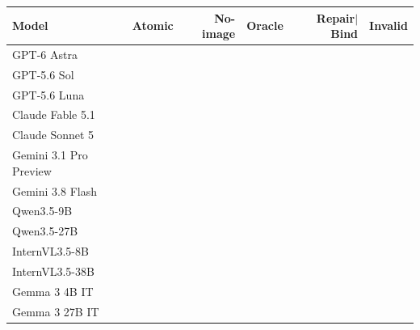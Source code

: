 \begin{tabular}{@{}lrrrrr@{}}
\toprule
Model & Atomic & No-image & Oracle & Repair$|$Bind & Invalid\\
\midrule
GPT-6 Astra &  &  &  &  & \\
GPT-5.6 Sol &  &  &  &  & \\
GPT-5.6 Luna &  &  &  &  & \\
Claude Fable 5.1 &  &  &  &  & \\
Claude Sonnet 5 &  &  &  &  & \\
Gemini 3.1 Pro Preview &  &  &  &  & \\
Gemini 3.8 Flash &  &  &  &  & \\
Qwen3.5-9B &  &  &  &  & \\
Qwen3.5-27B &  &  &  &  & \\
InternVL3.5-8B &  &  &  &  & \\
InternVL3.5-38B &  &  &  &  & \\
Gemma 3 4B IT &  &  &  &  & \\
Gemma 3 27B IT &  &  &  &  & \\
\bottomrule
\end{tabular}
